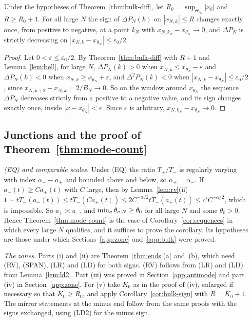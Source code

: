 \begin{corollary}\label{cor:bulk-sign}
Under the hypotheses of Theorem~\ref{thm:bulk-diff}, let $R_0=\sup_{\Theta_{\theta_0}}|x_\theta|$
and $R\ge R_0+1$. For all large $N$ the sign of $\Delta P_N(k)$ on $|x_{N,k}|\le R$ changes exactly
once, from positive to negative, at a point $k_N$ with $x_{N,k_N}-x_{\theta_N}\to0$, and $\Delta P_N$
is strictly decreasing on $|x_{N,k}-x_{\theta_N}|\le\varepsilon_0/2$.
\end{corollary}

\begin{proof}
Let $0<\varepsilon\le\varepsilon_0/2$. By Theorem~\ref{thm:bulk-diff} with $R+1$ and
Lemma~\ref{lem:bell}, for large $N$, $\Delta P_N(k)>0$ when $x_{N,k}\le x_{\theta_N}-\varepsilon$ and
$\Delta P_N(k)<0$ when $x_{N,k}\ge x_{\theta_N}+\varepsilon$, and $\Delta^2P_N(k)<0$ when
$|x_{N,k}-x_{\theta_N}|\le\varepsilon_0/2$, since $x_{N,k+2}-x_{N,k}=2/B_N\to0$. So on the window
around $x_{\theta_N}$ the sequence $\Delta P_N$ decreases strictly from a positive to a negative
value, and its sign changes exactly once, inside $|x-x_{\theta_N}|<\varepsilon$. Since
$\varepsilon$ is arbitrary, $x_{N,k_N}-x_{\theta_N}\to0$.
\end{proof}

\subsection{Junctions and the proof of Theorem~\ref{thm:mode-count}}\label{app:junctions}

\emph{(EQ) and comparable scales.} Under (EQ) the ratio $T_\plus/T_\minus$ is regularly varying
with index $\alpha_\minus-\alpha_\plus$ and bounded above and below, so
$\alpha_\plus=\alpha_\minus$. If $a_\minus(t)\ge Ca_\plus(t)$ with $C$ large, then by
Lemma~\ref{lem:rv}(ii)
$1\sim tT_\minus(a_\minus(t))\le tT_\minus(Ca_\plus(t))\le2C^{-\alpha/2}tT_\minus(a_\plus(t))\le c'C^{-\alpha/2}$,
which is impossible. So $a_\plus\asymp a_\minus$, and $\min_\sigma\theta_{\sigma,N}\ge\theta_0$ for all
large $N$ and some $\theta_0>0$. Hence Theorem~\ref{thm:mode-count} is the case of
Corollary~\ref{cor:sequences} in which every large $N$ qualifies, and it suffices to prove the
corollary. Its hypotheses are those under which Sections~\ref{app:zone} and~\ref{app:bulk} were
proved.

\emph{The zones.} Parts (i) and (ii) are Theorem~\ref{thm:ends}(a) and~(b), which need (RV),
(SPAN), (LR) and (LD) for both signs. (RV) follows from (LR) and (LD) from Lemma~\ref{lem:ld2}.
Part (iii) was proved in Section~\ref{app:antimode} and part (iv) in Section~\ref{app:zone}. For
(v) take $K_0$ as in the proof of (iv), enlarged if necessary so that $K_0\ge R_0$, and apply Corollary~\ref{cor:bulk-sign} with
$R=K_0+1$. The mirror statements at the minus end follow from the same proofs with the signs
exchanged, using (LD2) for the minus sign.

